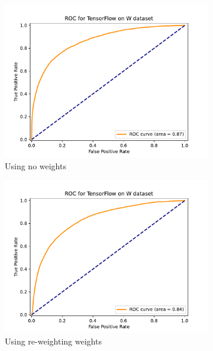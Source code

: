 \documentclass[12pt, a4paper]{book}
\begin{document}
\begin{figure}[!ht]
	\centering
	\begin{subfigure}[b]{0.49\textwidth}
         \centering
         \includegraphics[width=1\textwidth]{Unweighted/ROC.pdf}
         \caption{Using no weights}\label{fig:WROCUW}
      \end{subfigure}
      \hfill
      \begin{subfigure}[b]{0.49\textwidth}
         \centering
         \includegraphics[width=1\textwidth]{Weighted/ROC.pdf}
         \caption{Using re-weighting weights}\label{fig:WROCMC}
      \end{subfigure}
      \begin{subfigure}[b]{0.49\textwidth}

\end{subfigure}
\end{figure}
\end{document}
